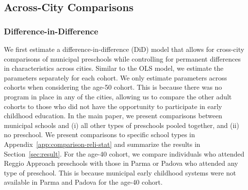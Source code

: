 

\subsection{Across-City Comparisons} \label{sec:across-city-analysis}
\subsubsection{Difference-in-Difference}  \label{subsubsection:DID}


We first estimate a difference-in-difference (DiD) model that allows for cross-city comparisons of municipal preschools while controlling for permanent differences in characteristics across cities. Similar to the OLS model, we estimate the parameters separately for each cohort. We only estimate parameters across cohorts when considering the age-50 cohort. This is because there was no program in place in any of the cities, allowing us to compare the other adult cohorts to those who did not have the opportunity to participate in early childhood education. In the main paper, we present comparisons between municipal schools and (i) all other types of preschools pooled together, and (ii) no preschool. We present comparisons to specific school types in Appendix~\ref{app:comparison-reli-stat} and summarize the results in Section~\ref{sec:result}. For the age-40 cohort, we compare individuals who attended Reggio Approach preschools with those in Parma or Padova who attended any type of preschool. This is because municipal early childhood systems were not available in Parma and Padova for the age-40 cohort.

